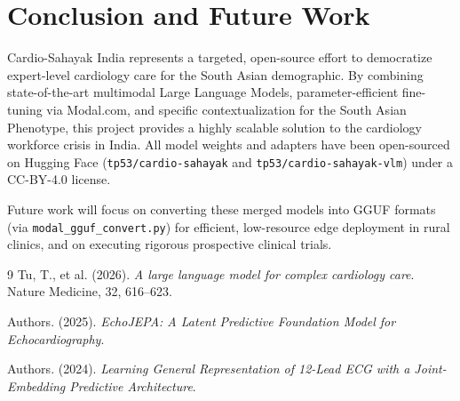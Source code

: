 \documentclass[11pt,a4paper]{article}
\begin{document}
\section{Conclusion and Future Work}
Cardio-Sahayak India represents a targeted, open-source effort to democratize expert-level cardiology care for the South Asian demographic. By combining state-of-the-art multimodal Large Language Models, parameter-efficient fine-tuning via Modal.com, and specific contextualization for the South Asian Phenotype, this project provides a highly scalable solution to the cardiology workforce crisis in India. All model weights and adapters have been open-sourced on Hugging Face (\texttt{tp53/cardio-sahayak} and \texttt{tp53/cardio-sahayak-vlm}) under a CC-BY-4.0 license.

Future work will focus on converting these merged models into GGUF formats (via \texttt{modal\_gguf\_convert.py}) for efficient, low-resource edge deployment in rural clinics, and on executing rigorous prospective clinical trials.

\begin{thebibliography}{9}
Tu, T., et al. (2026). \textit{A large language model for complex cardiology care}. Nature Medicine, 32, 616--623.

Authors. (2025). \textit{EchoJEPA: A Latent Predictive Foundation Model for Echocardiography}. 

Authors. (2024). \textit{Learning General Representation of 12-Lead ECG with a Joint-Embedding Predictive Architecture}.
\end{thebibliography}
\end{document}
